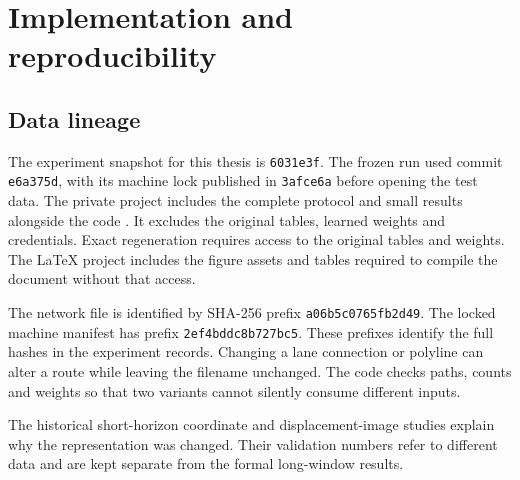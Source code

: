 \chapter{Implementation and reproducibility}
\label{app:rep}
\section{Data lineage}
The experiment snapshot for this thesis is \texttt{6031e3f}. The frozen run used commit \texttt{e6a375d}, with its machine lock published in \texttt{3afce6a} before opening the test data. The private project includes the complete protocol and small results alongside the code \cite{project}. It excludes the original tables, learned weights and credentials. Exact regeneration requires access to the original tables and weights. The LaTeX project includes the figure assets and tables required to compile the document without that access.

The network file is identified by SHA-256 prefix \texttt{a06b5c0765fb2d49}. The locked machine manifest has prefix \texttt{2ef4bddc8b727bc5}. These prefixes identify the full hashes in the experiment records. Changing a lane connection or polyline can alter a route while leaving the filename unchanged. The code checks paths, counts and weights so that two variants cannot silently consume different inputs.

The historical short-horizon coordinate and displacement-image studies explain why the representation was changed. Their validation numbers refer to different data and are kept separate from the formal long-window results.


